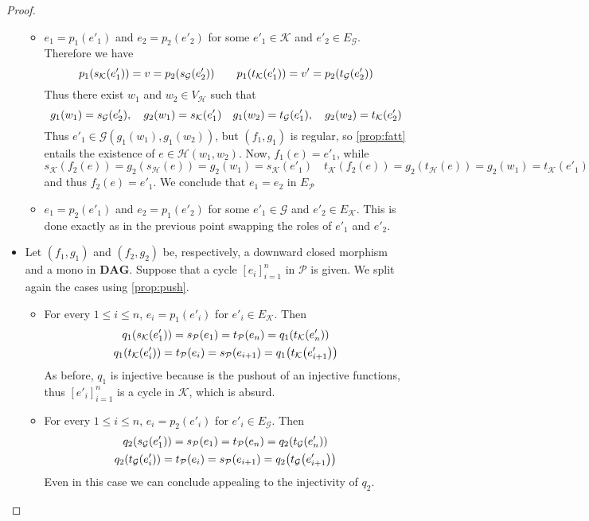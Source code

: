 \documentclass[runningheads,envcountsect]{lmcs}
\newcommand{\dg}{\catname{DAG}}
\newcommand{\catname}[1]{\mathbf{#1}}
\theoremstyle{plain}
\theoremstyle{definition}
\begin{document}
\begin{proof}
\begin{itemize}
\begin{itemize}
		\item $e_1=p_1(e'_1)$ and $e_2=p_2(e'_2)$ for some $e'_1\in \mathcal{K}$ and $e'_2\in E_{\mathcal{G}}$. Therefore we have		
		\[p_1\qty(s_{\mathcal{K}}\qty(e'_1))=v=p_2\qty(s_{\mathcal{G}}\qty(e'_2)) \qquad p_1\qty(t_{\mathcal{K}}\qty(e'_1))=v'=p_2\qty(t_{\mathcal{G}}\qty(e'_2)) \]
	Thus there exist $w_1$ and $w_2\in V_{\mathcal{H}}$ such that 
	\[g_1(w_1)=s_{\mathcal{G}}\qty(e'_2), \quad g_2(w_1)=s_{\mathcal{K}}\qty(e'_1) \quad g_1(w_2)=t_{\mathcal{G}}\qty(e'_1), \quad g_2(w_2)=t_{\mathcal{K}}\qty(e'_2) \]
	Thus $e'_1\in \mathcal{G}(g_1(w_1), g_1(w_2))$, but $(f_1, g_1)$ is regular, so \cref{prop:fatt} entails the existence of $e\in\mathcal{H}(w_1, w_2)$. Now, $f_1(e)=e'_1$, while 
	\[s_{\mathcal{K}}(f_2(e))=g_2(s_{\mathcal{H}}(e))=g_2(w_1)=s_{\mathcal{K}}(e'_1) \quad t_{\mathcal{K}}(f_2(e))=g_2(t_{\mathcal{H}}(e))=g_2(w_1)=t_{\mathcal{K}}(e'_1)\]
	and thus $f_2(e)=e'_1$. We conclude that $e_1=e_2$ in $E_\mathcal{P}$
	
	\item $e_1=p_2(e'_1)$ and $e_2=p_1(e'_2)$ for some $e'_1\in \mathcal{G}$ and $e'_2\in E_{\mathcal{K}}$. This is done exactly as in the previous point swapping the roles of $e'_1$ and $e'_2$.
\end{itemize} 
\item Let $(f_1, g_1)$ and $(f_2,g_2)$ be, respectively, a downward closed morphism and a mono in $\dg$. Suppose that a cycle $[e_i]_{i=1}^n$ in $\mathcal{P}$ is given. We split again the cases using \cref{prop:push}.
\begin{itemize}
	\item For every $1\leq i\leq n$, $e_i=p_1(e'_i)$ for $e'_i\in E_{\mathcal{K}}$. Then 
	\begin{gather*}q_1\qty(s_{\mathcal{K}}\qty(e'_1))=s_{\mathcal{P}}\qty(e_1)=t_{\mathcal{P}}\qty(e_n)=q_1\qty(t_{\mathcal{K}}\qty(e'_n))\\
q_1\qty(t_{\mathcal{K}}\qty(e'_i))=t_{\mathcal{P}}\qty(e_i)=	s_{\mathcal{P}}(e_{i+1})=q_1\qty(t_{\mathcal{K}}\qty(e'_{i+1}))
	\end{gather*}
As before, $q_1$ is injective because is the pushout of an injective functions, thus $[e'_i]_{i=1}^n$	is a cycle in $\mathcal{K}$, which is absurd.
	\item For every $1\leq i\leq n$, $e_i=p_2(e'_i)$ for $e'_i\in E_{\mathcal{G}}$. Then 
	\begin{gather*}q_2\qty(s_{\mathcal{G}}\qty(e'_1))=s_{\mathcal{P}}\qty(e_1)=t_{\mathcal{P}}\qty(e_n)=q_2\qty(t_{\mathcal{G}}\qty(e'_n))\\
	q_2\qty(t_{\mathcal{G}}\qty(e'_i))=t_{\mathcal{P}}\qty(e_i)=	s_{\mathcal{P}}(e_{i+1})=q_2\qty(t_{\mathcal{G}}\qty(e'_{i+1}))
	\end{gather*}
	Even in this case we can conclude appealing to the injectivity of $q_2$.
\end{itemize} 
\medskip 


\end{itemize}
\end{proof}
\end{document}
